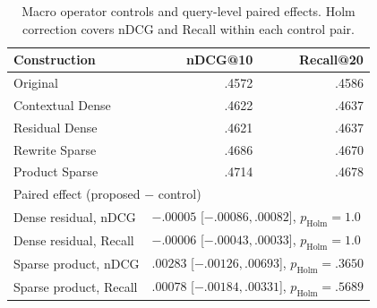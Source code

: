 \begin{table}[H]
\centering
\scriptsize
\setlength{\tabcolsep}{2.8pt}
\begin{tabular}{@{}lrr@{}}
\toprule
Construction & nDCG@10 & Recall@20 \\
\midrule
Original          & .4572 & .4586 \\
Contextual Dense  & .4622 & .4637 \\
Residual Dense    & .4621 & .4637 \\
Rewrite Sparse    & .4686 & .4670 \\
Product Sparse    & .4714 & .4678 \\
\midrule
\multicolumn{3}{l}{Paired effect (proposed $-$ control)} \\
Dense residual, nDCG   & \multicolumn{2}{l}{$-.00005$ [$-.00086,.00082$], $p_{\mathrm{Holm}}=1.0$} \\
Dense residual, Recall & \multicolumn{2}{l}{$-.00006$ [$-.00043,.00033$], $p_{\mathrm{Holm}}=1.0$} \\
Sparse product, nDCG   & \multicolumn{2}{l}{$ .00283$ [$-.00126,.00693$], $p_{\mathrm{Holm}}=.3650$} \\
Sparse product, Recall & \multicolumn{2}{l}{$ .00078$ [$-.00184,.00331$], $p_{\mathrm{Holm}}=.5689$} \\
\bottomrule
\end{tabular}
\caption{Macro operator controls and query-level paired effects. Holm
correction covers nDCG and Recall within each control pair.}
\label{tab:operator-controls}
\end{table}